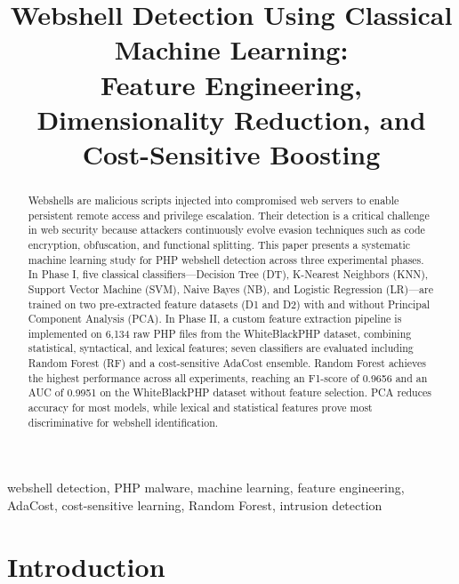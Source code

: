 \documentclass[journal,twocolumn]{IEEEtran}
\begin{document}
\title{Webshell Detection Using Classical Machine Learning:\\
Feature Engineering, Dimensionality Reduction, and Cost-Sensitive Boosting}

\author{
}

\maketitle

\begin{abstract}
Webshells are malicious scripts injected into compromised web servers to enable persistent remote access and privilege escalation. Their detection is a critical challenge in web security because attackers continuously evolve evasion techniques such as code encryption, obfuscation, and functional splitting. This paper presents a systematic machine learning study for PHP webshell detection across three experimental phases. In Phase I, five classical classifiers---Decision Tree (DT), K-Nearest Neighbors (KNN), Support Vector Machine (SVM), Naive Bayes (NB), and Logistic Regression (LR)---are trained on two pre-extracted feature datasets (D1 and D2) with and without Principal Component Analysis (PCA). In Phase II, a custom feature extraction pipeline is implemented on 6,134 raw PHP files from the WhiteBlackPHP dataset, combining statistical, syntactical, and lexical features; seven classifiers are evaluated including Random Forest (RF) and a cost-sensitive AdaCost ensemble. Random Forest achieves the highest performance across all experiments, reaching an F1-score of 0.9656 and an AUC of 0.9951 on the WhiteBlackPHP dataset without feature selection. PCA reduces accuracy for most models, while lexical and statistical features prove most discriminative for webshell identification.
\end{abstract}

\begin{IEEEkeywords}
webshell detection, PHP malware, machine learning, feature engineering, AdaCost, cost-sensitive learning, Random Forest, intrusion detection
\end{IEEEkeywords}

\section{Introduction}
\end{document}

